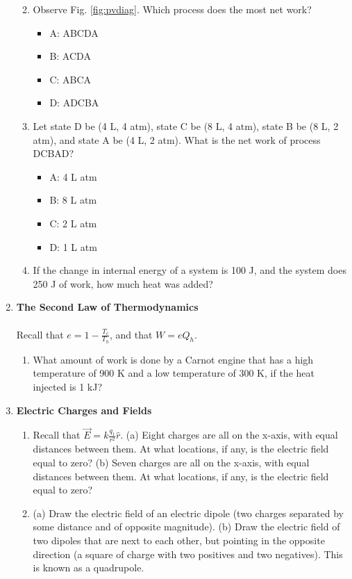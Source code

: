 \documentclass[10pt]{article}
\begin{document}
\begin{enumerate}
\begin{enumerate}
\begin{figure}
\end{figure}
\item Observe Fig. \ref{fig:pvdiag}.  Which process does the most net work?
\begin{itemize}
\item A: ABCDA
\item B: ACDA
\item C: ABCA
\item D: ADCBA
\end{itemize}
\item Let state D be (4 L, 4 atm), state C be (8 L, 4 atm), state B be (8 L, 2 atm), and state A be (4 L, 2 atm).  What is the net work of process DCBAD?
\begin{itemize}
\item A: 4 L atm
\item B: 8 L atm
\item C: 2 L atm
\item D: 1 L atm
\end{itemize}
\item If the change in internal energy of a system is 100 J, and the system does 250 J of work, how much heat was added? \\ \vspace{2cm}
\end{enumerate}
\item \textbf{The Second Law of Thermodynamics}
\\ \\ Recall that $e = 1-\frac{T_c}{T_h}$, and that $W = e Q_h$.
\begin{enumerate}
\item What amount of work is done by a Carnot engine that has a high temperature of 900 K and a low temperature of 300 K, if the heat injected is 1 kJ? \\ \vspace{3cm}
\end{enumerate}
\item \textbf{Electric Charges and Fields}
\begin{enumerate}
\item Recall that $\vec{E} = k \frac{q_1}{r^2}\hat{r}$.  (a) Eight charges are all on the x-axis, with equal distances between them.  At what locations, if any, is the electric field equal to zero?  (b) Seven charges are all on the x-axis, with equal distances between them.  At what locations, if any, is the electric field equal to zero? \\ \vspace{2cm}
\item (a) Draw the electric field of an electric dipole (two charges separated by some distance and of opposite magnitude). (b) Draw the electric field of two dipoles that are next to each other, but pointing in the opposite direction (a square of charge with two positives and two negatives).  This is known as a quadrupole.  \\ \vspace{3cm}

\end{enumerate}
\end{enumerate}
\end{document}
